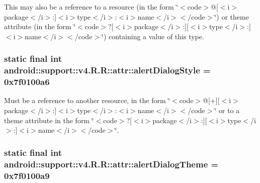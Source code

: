 This may also be a reference to a resource (in the form \char`\"{}$<$code$>$@\mbox{[}$<$i$>$package$<$/i$>$:\mbox{]}$<$i$>$type$<$/i$>$:$<$i$>$name$<$/i$>$$<$/code$>$\char`\"{}) or theme attribute (in the form \char`\"{}$<$code$>$?\mbox{[}$<$i$>$package$<$/i$>$:\mbox{]}\mbox{[}$<$i$>$type$<$/i$>$:\mbox{]}$<$i$>$name$<$/i$>$$<$/code$>$\char`\"{}) containing a value of this type. \hypertarget{classandroid_1_1support_1_1v4_1_1_r_1_1attr_6d37d12f2925d459ee03c54a948af972}{
\subsubsection[{alertDialogStyle}]{\setlength{\rightskip}{0pt plus 5cm}static final int android::support::v4.R.R::attr::alertDialogStyle = 0x7f0100a6}}
\label{classandroid_1_1support_1_1v4_1_1_r_1_1attr_6d37d12f2925d459ee03c54a948af972}


Must be a reference to another resource, in the form \char`\"{}$<$code$>$@\mbox{[}+\mbox{]}\mbox{[}$<$i$>$package$<$/i$>$:\mbox{]}$<$i$>$type$<$/i$>$:$<$i$>$name$<$/i$>$$<$/code$>$\char`\"{} or to a theme attribute in the form \char`\"{}$<$code$>$?\mbox{[}$<$i$>$package$<$/i$>$:\mbox{]}\mbox{[}$<$i$>$type$<$/i$>$:\mbox{]}$<$i$>$name$<$/i$>$$<$/code$>$\char`\"{}. \hypertarget{classandroid_1_1support_1_1v4_1_1_r_1_1attr_429fcb5f65db45c5f94b49b9dc967e8e}{
\subsubsection[{alertDialogTheme}]{\setlength{\rightskip}{0pt plus 5cm}static final int android::support::v4.R.R::attr::alertDialogTheme = 0x7f0100a9}}
\label{classandroid_1_1support_1_1v4_1_1_r_1_1attr_429fcb5f65db45c5f94b49b9dc967e8e}


